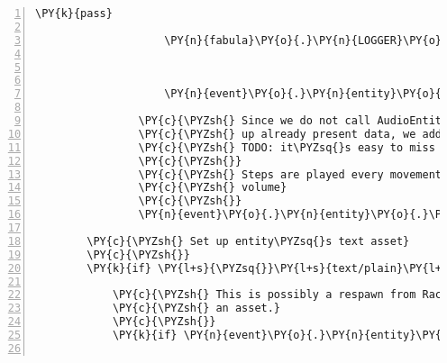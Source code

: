 \begin{Verbatim}[commandchars=\\\{\},numbers=left,firstnumber=1,stepnumber=1]
                        \PY{k}{pass}

                    \PY{n}{fabula}\PY{o}{.}\PY{n}{LOGGER}\PY{o}{.}\PY{n}{debug}\PY{p}{(}\PY{l+s}{\PYZdq{}}\PY{l+s}{changing class of }\PY{l+s}{\PYZsq{}}\PY{l+s}{\PYZob{}\PYZcb{}}\PY{l+s}{\PYZsq{}}\PY{l+s}{ from \PYZob{}\PYZcb{} to bases \PYZob{}\PYZcb{}}\PY{l+s}{\PYZdq{}}\PY{o}{.}\PY{n}{format}\PY{p}{(}\PY{n}{event}\PY{o}{.}\PY{n}{entity}\PY{o}{.}\PY{n}{identifier}\PY{p}{,}
                                                                                            \PY{n}{event}\PY{o}{.}\PY{n}{entity}\PY{o}{.}\PY{n}{\PYZus{}\PYZus{}class\PYZus{}\PYZus{}}\PY{p}{,}
                                                                                            \PY{n}{ExtendedEntity}\PY{o}{.}\PY{n}{\PYZus{}\PYZus{}bases\PYZus{}\PYZus{}}\PY{p}{)}\PY{p}{)}

                    \PY{n}{event}\PY{o}{.}\PY{n}{entity}\PY{o}{.}\PY{n}{\PYZus{}\PYZus{}class\PYZus{}\PYZus{}} \PY{o}{=} \PY{n}{ExtendedEntity}

                \PY{c}{\PYZsh{} Since we do not call AudioEntity.\PYZus{}\PYZus{}init\PYZus{}\PYZus{}() to prevent messing}
                \PY{c}{\PYZsh{} up already present data, we add required attributes}
                \PY{c}{\PYZsh{} TODO: it\PYZsq{}s easy to miss that when changing the PygameEntity.\PYZus{}\PYZus{}init\PYZus{}\PYZus{}()}
                \PY{c}{\PYZsh{}}
                \PY{c}{\PYZsh{} Steps are played every movement therefore they play at a low}
                \PY{c}{\PYZsh{} volume}
                \PY{c}{\PYZsh{}}
                \PY{n}{event}\PY{o}{.}\PY{n}{entity}\PY{o}{.}\PY{n}{assets}\PY{p}{[}\PY{l+s}{\PYZsq{}}\PY{l+s}{audio/ogg}\PY{l+s}{\PYZsq{}}\PY{p}{]}\PY{o}{.}\PY{n}{data}\PY{o}{.}\PY{n}{set\PYZus{}volume}\PY{p}{(}\PY{l+m+mf}{0.3}\PY{p}{)}

        \PY{c}{\PYZsh{} Set up entity\PYZsq{}s text asset}
        \PY{c}{\PYZsh{}}
        \PY{k}{if} \PY{l+s}{\PYZsq{}}\PY{l+s}{text/plain}\PY{l+s}{\PYZsq{}} \PY{o+ow}{in} \PY{n}{event}\PY{o}{.}\PY{n}{entity}\PY{o}{.}\PY{n}{assets}\PY{o}{.}\PY{n}{keys}\PY{p}{(}\PY{p}{)}\PY{p}{:}

            \PY{c}{\PYZsh{} This is possibly a respawn from Rack, and the entity already has}
            \PY{c}{\PYZsh{} an asset.}
            \PY{c}{\PYZsh{}}
            \PY{k}{if} \PY{n}{event}\PY{o}{.}\PY{n}{entity}\PY{o}{.}\PY{n}{assets}\PY{p}{[}\PY{l+s}{\PYZsq{}}\PY{l+s}{text/plain}\PY{l+s}{\PYZsq{}}\PY{p}{]}\PY{o}{.}\PY{n}{data} \PY{o+ow}{is} \PY{o+ow}{not} \PY{n+nb+bp}{None}\PY{p}{:}


\end{Verbatim}
